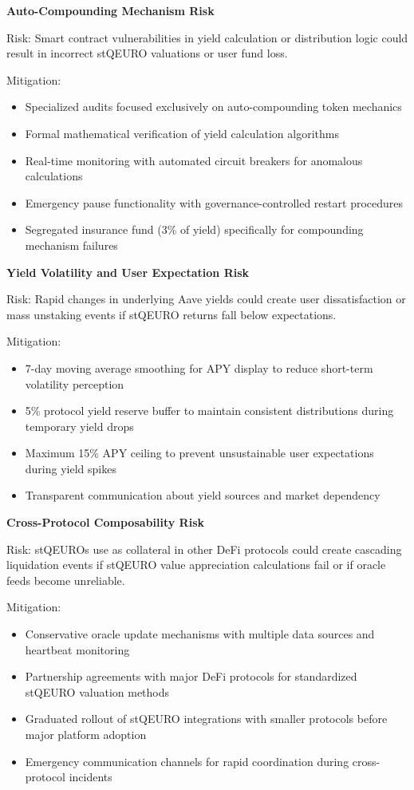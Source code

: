 \textbf{Auto-Compounding Mechanism Risk}

Risk: Smart contract vulnerabilities in yield calculation or
distribution logic could result in incorrect stQEURO valuations or user
fund loss.

Mitigation:

\begin{itemize}
\item
  Specialized audits focused exclusively on auto-compounding token
  mechanics
\item
  Formal mathematical verification of yield calculation algorithms
\item
  Real-time monitoring with automated circuit breakers for anomalous
  calculations
\item
  Emergency pause functionality with governance-controlled restart
  procedures
\item
  Segregated insurance fund (3\% of yield) specifically for compounding
  mechanism failures
\end{itemize}

\textbf{Yield Volatility and User Expectation Risk}

Risk: Rapid changes in underlying Aave yields could create user
dissatisfaction or mass unstaking events if stQEURO returns fall below
expectations.

Mitigation:

\begin{itemize}
\item
  7-day moving average smoothing for APY display to reduce short-term
  volatility perception
\item
  5\% protocol yield reserve buffer to maintain consistent distributions
  during temporary yield drops
\item
  Maximum 15\% APY ceiling to prevent unsustainable user expectations
  during yield spikes
\item
  Transparent communication about yield sources and market dependency
\end{itemize}

\textbf{Cross-Protocol Composability Risk}

Risk: stQEURO\textquotesingle s use as collateral in other DeFi
protocols could create cascading liquidation events if stQEURO value
appreciation calculations fail or if oracle feeds become unreliable.

Mitigation:

\begin{itemize}
\item
  Conservative oracle update mechanisms with multiple data sources and
  heartbeat monitoring
\item
  Partnership agreements with major DeFi protocols for standardized
  stQEURO valuation methods
\item
  Graduated rollout of stQEURO integrations with smaller protocols
  before major platform adoption
\item
  Emergency communication channels for rapid coordination during
  cross-protocol incidents
\end{itemize}

